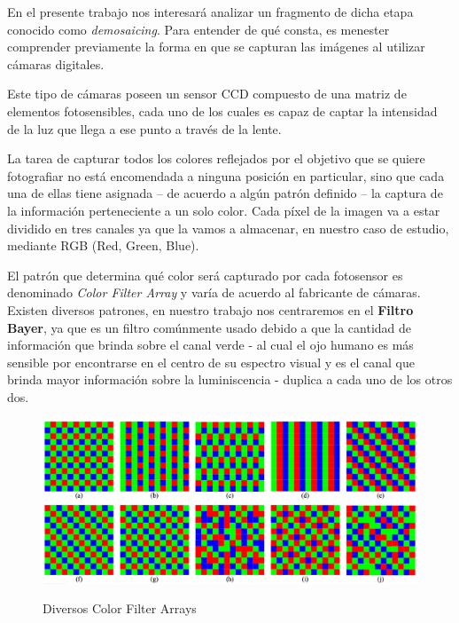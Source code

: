 \documentclass[a4paper]{article}
\begin{document}
En el presente trabajo nos interesará analizar un fragmento de dicha etapa conocido como \emph{demosaicing}. Para entender de qué consta, es menester comprender previamente la forma en que se capturan las imágenes al utilizar cámaras digitales.

Este tipo de cámaras poseen un sensor CCD compuesto de una matriz de elementos fotosensibles, cada uno de los cuales es capaz de captar la intensidad de la luz que llega a ese punto a través de la lente. 

La tarea de capturar todos los colores reflejados por el objetivo que se quiere fotografiar no está encomendada a ninguna posición en particular, sino que cada una de ellas tiene asignada – de acuerdo a algún patrón definido  – la captura de la información perteneciente a un solo color. Cada p\'ixel de la imagen va a estar dividido en tres canales ya que la vamos a almacenar, en nuestro caso de estudio, mediante RGB (Red, Green, Blue).

El patr\'on que determina qué color será capturado por cada fotosensor es denominado \emph{Color Filter Array} y var\'ia de acuerdo al fabricante de c\'amaras. Existen diversos patrones, en nuestro trabajo nos centraremos en el \textbf{Filtro Bayer}, ya que es un filtro com\'unmente usado debido a que la cantidad de informaci\'on que brinda sobre el canal verde - al cual el ojo humano es más sensible por encontrarse en el centro de su espectro visual y es el canal que brinda mayor informaci\'on sobre la luminiscencia -  duplica a cada uno de los otros dos.


\begin{figure}[h!]
	\caption{Diversos Color Filter Arrays}
	\begin{center}
	\includegraphics[scale=0.50]{imagenes/cfa}
	\label{cfa}
  \end{center}
\end{figure}

\newpage
\end{document}
